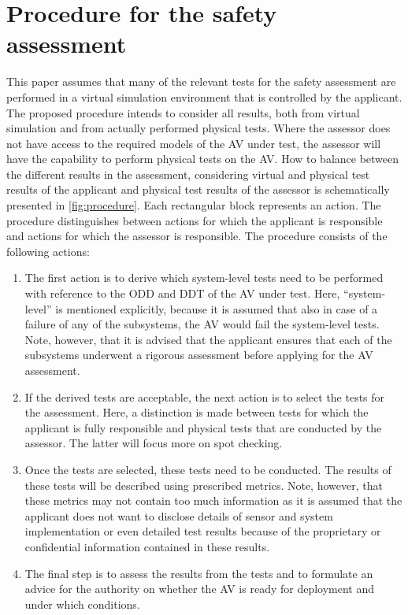 \section{Procedure for the safety assessment}
\label{sec:procedure}

This paper assumes that many of the relevant tests for the safety assessment are performed in a virtual simulation environment that is controlled by the applicant. The proposed procedure intends to consider all results, both from virtual simulation and from actually performed physical tests. Where the assessor does not have access to the required models of the AV under test, the assessor will have the capability to perform physical tests on the AV. How to balance between the different results in the assessment, considering virtual and physical test results of the applicant and physical test results of the assessor is schematically presented in \cref{fig:procedure}. Each rectangular block represents an action. The procedure distinguishes between actions for which the applicant is responsible and actions for which the assessor is responsible. The procedure consists of the following actions:
\begin{enumerate}
	\item The first action is to derive which system-level tests need to be performed with reference to the ODD and DDT of the AV under test. Here, “system-level” is mentioned explicitly, because it is assumed that also in case of a failure of any of the subsystems, the AV would fail the system-level tests. Note, however, that it is advised that the applicant ensures that each of the subsystems underwent a rigorous assessment before applying for the AV assessment. 
	\item If the derived tests are acceptable, the next action is to select the tests for the assessment. Here, a distinction is made between tests for which the applicant is fully responsible and physical tests that are conducted by the assessor. The latter will focus more on spot checking.
	\item Once the tests are selected, these tests need to be conducted. The results of these tests will be described using prescribed metrics. Note, however, that these metrics may not contain too much information as it is assumed that the applicant does not want to disclose details of sensor and system implementation or even detailed test results because of the proprietary or confidential information contained in these results. 
	\item The final step is to assess the results from the tests and to formulate an advice for the authority on whether the AV is ready for deployment and under which conditions.
\end{enumerate}

